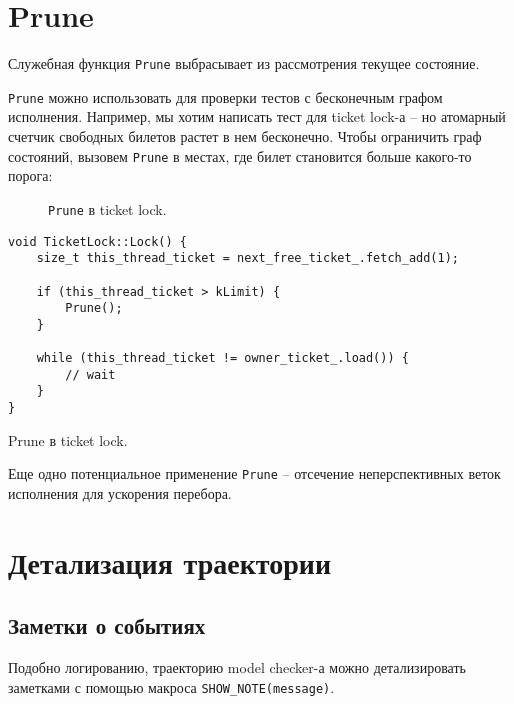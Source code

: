 \fi


\section{Prune}

Служебная функция \texttt{Prune} выбрасывает из рассмотрения текущее состояние.

\texttt{Prune} можно использовать для проверки тестов с бесконечным графом исполнения. Например, мы хотим написать тест для ticket lock-а – но атомарный счетчик свободных билетов растет в нем бесконечно. Чтобы ограничить граф состояний, вызовем \texttt{Prune} в местах, где билет становится больше какого-то порога: 


\begin{figure}
	\bigskip
	\caption{\texttt{Prune} в ticket lock.}
\end{figure}

\else

\begin{listing}
	\centering
	
	\begin{verbatim}
void TicketLock::Lock() {
	size_t this_thread_ticket = next_free_ticket_.fetch_add(1);

	if (this_thread_ticket > kLimit) {
		Prune();
	}

	while (this_thread_ticket != owner_ticket_.load()) {
		// wait
	}
}
	\end{verbatim}
	\caption{Prune в ticket lock.}
	
\end{listing}

\fi

Еще одно потенциальное применение \texttt{Prune} – отсечение неперспективных веток исполнения для ускорения перебора.

\section{Детализация траектории}


\subsection{Заметки о событиях}

Подобно логированию, траекторию model checker-а можно детализировать заметками с помощью макроса \texttt{SHOW_NOTE(message)}.

